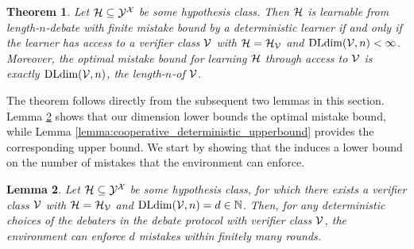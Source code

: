 \documentclass[11pt,letterpaper]{article}
\newtheorem{theorem}{Theorem}
\newtheorem{lemma}[theorem]{Lemma}
\theoremstyle{definition}
\theoremstyle{plain}
\begin{document}
\begin{theorem}
Let ${{\mathcal H}}\subseteq {\mathcal Y}^{\mathcal X}$ be some hypothesis class. Then ${{\mathcal H}}$ is learnable from length-$n$-debate with finite mistake bound by a deterministic learner if and only if the learner has access to a verifier class ${\mathcal V}$ with ${{\mathcal H}} = {{\mathcal H}}_{\mathcal V}$ and $\mathrm{DLdim}({\mathcal V}, n) <\infty$.
Moreover, the optimal mistake bound for learning ${{\mathcal H}}$ through access to ${\mathcal V}$ is exactly $\mathrm{DLdim}({\mathcal V}, n)$, the length-$n$-\debatedimname of ${\mathcal V}$.
\end{theorem}

The theorem follows directly from the subsequent two lemmas in this section. Lemma \ref{lemma:cooperative_deterministic_lowerbound} shows that our dimension lower bounds the optimal mistake bound, while Lemma \ref{lemma:cooperative_deterministic_upperbound} provides the corresponding upper bound.
We start by showing that the \debatedimname induces a lower bound on the number of mistakes that the environment can enforce.

\begin{lemma}\label{lemma:cooperative_deterministic_lowerbound}
Let ${{\mathcal H}}\subseteq {\mathcal Y}^{\mathcal X}$ be some hypothesis class, for which there exists a verifier class ${\mathcal V}$ with ${{\mathcal H}} = {{\mathcal H}}_{\mathcal V}$ and $\mathrm{DLdim}({\mathcal V}, n) = d \in \mathbb{N}$. Then, for any deterministic choices of the debaters in the debate protocol with verifier class ${\mathcal V}$, the environment can enforce $d$ mistakes within finitely many rounds.
\end{lemma}
\end{document}
